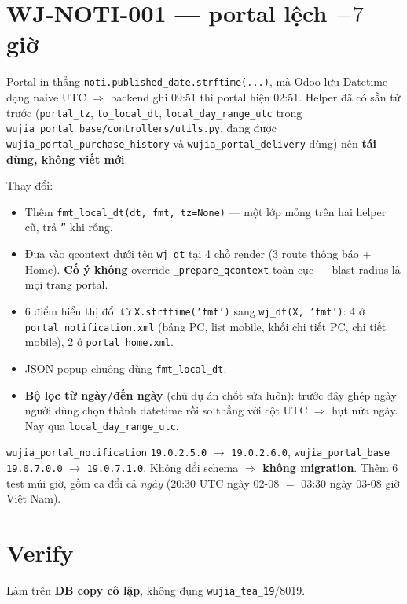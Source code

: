 \section{WJ-NOTI-001 --- portal lệch $-7$ giờ}

Portal in thẳng \texttt{noti.published\_date.strftime(...)}, mà Odoo lưu Datetime dạng naive UTC
$\Rightarrow$ backend ghi 09:51 thì portal hiện 02:51. Helper đã có sẵn từ trước
(\texttt{portal\_tz}, \texttt{to\_local\_dt}, \texttt{local\_day\_range\_utc} trong
\texttt{wujia\_portal\_base/controllers/utils.py}, đang được
\texttt{wujia\_portal\_purchase\_history} và \texttt{wujia\_portal\_delivery} dùng) nên
\textbf{tái dùng, không viết mới}.

Thay đổi:

\begin{itemize}
  \item Thêm \texttt{fmt\_local\_dt(dt, fmt, tz=None)} --- một lớp mỏng trên hai helper cũ, trả
    \texttt{''} khi rỗng.
  \item Đưa vào qcontext dưới tên \texttt{wj\_dt} tại 4 chỗ render (3 route thông báo $+$ Home).
    \textbf{Cố ý không} override \texttt{\_prepare\_qcontext} toàn cục --- blast radius là mọi
    trang portal.
  \item 6 điểm hiển thị đổi từ \texttt{X.strftime('fmt')} sang \texttt{wj\_dt(X, 'fmt')}: 4 ở
    \texttt{portal\_notification.xml} (bảng PC, list mobile, khối chi tiết PC, chi tiết mobile),
    2 ở \texttt{portal\_home.xml}.
  \item JSON popup chuông dùng \texttt{fmt\_local\_dt}.
  \item \textbf{Bộ lọc từ ngày/đến ngày} (chủ dự án chốt sửa luôn): trước đây ghép ngày người
    dùng chọn thành datetime rồi so thẳng với cột UTC $\Rightarrow$ hụt nửa ngày. Nay qua
    \texttt{local\_day\_range\_utc}.
\end{itemize}

\texttt{wujia\_portal\_notification} \texttt{19.0.2.5.0} $\rightarrow$ \texttt{19.0.2.6.0},
\texttt{wujia\_portal\_base} \texttt{19.0.7.0.0} $\rightarrow$ \texttt{19.0.7.1.0}. Không đổi
schema $\Rightarrow$ \textbf{không migration}. Thêm 6 test múi giờ, gồm ca đổi cả \emph{ngày}
(20:30 UTC ngày 02-08 $=$ 03:30 ngày 03-08 giờ Việt Nam).

\section{Verify}

Làm trên \textbf{DB copy cô lập}, không đụng \texttt{wujia\_tea\_19}/8019.

